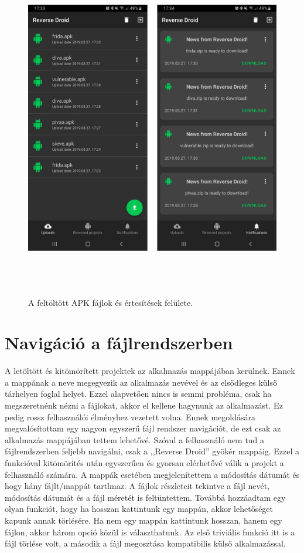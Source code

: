 \documentclass{thesis-ekf}
\theoremstyle{definition}
\theoremstyle{remark}
\begin{document}
\begin{figure}[!h]
	\centering
	\includegraphics[height=15cm]{pictures/android_uploads_notifications}
	\caption{A feltöltött APK fájlok és értesítések felülete.}
	\label{uploads_notifications}
\end{figure}

\section{Navigáció a fájlrendszerben}

A letöltött és kitömörített projektek az alkalmazás mappájában kerülnek.
Ennek a mappának a neve megegyezik az alkalmazás nevével és az elsődleges külső tárhelyen foglal helyet.
Ezzel alapvetően nincs is semmi probléma, csak ha megszeretnénk nézni a fájlokat, akkor el kellene hagynunk az alkalmazást.
Ez pedig rossz felhasználói élményhez vezetett volna.
Ennek megoldására megvalósítottam egy nagyon egyszerű fájl rendszer navigációt, de ezt csak az alkalmazás mappájában tettem lehetővé.
Szóval a felhasználó nem tud a fájlrendszerben feljebb navigálni, csak a ,,Reverse Droid'' gyökér mappáig.
Ezzel a funkcióval kitömörítés után egyszerűen és gyorsan elérhetővé válik a projekt a felhasználó számára.
A mappák esetében megjelenítettem a módosítás dátumát és hogy hány fájlt/mappát tartlmaz.
A fájlok részleteit tekintve a fájl nevét, módosítás dátumát és a fájl méretét is feltüntettem.
Továbbá hozzáadtam egy olyan funkciót, hogy ha hosszan kattintunk egy mappán, akkor lehetőséget kapunk annak törlésére.
Ha nem egy mappán kattintunk hosszan, hanem egy fájlon, akkor három opció közül is választhatunk.
Az első triviális funkció itt is a fájl törlése volt, a második a fájl megosztása kompatibilis külső alkalmazással.
\end{document}
